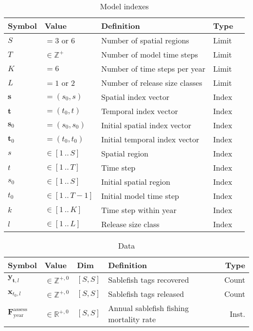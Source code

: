 \documentclass{article}
\begin{document}
\begin{table}[ht]
  \centering
  \caption{Model indexes}
  \renewcommand\arraystretch{1.2}
  \label{tab:model-indexes}
  \begin{tabular}{l l l l r}
    \toprule
    \textbf{Symbol} & \textbf{Value} & \textbf{Definition} & \textbf{Type} \\
    \toprule
    $S$ & $= 3$ or $6$ & Number of spatial regions & Limit \\
    $T$ & $\in \mathbb{Z}^{+}$ & Number of model time steps & Limit \\
    $K$ & $= 6$ & Number of time steps per year & Limit \\
    $L$ & $= 1$ or $2$ & Number of release size classes & Limit \\
    \midrule
    $\boldsymbol{s}$ & $= (s_0, s)$ & Spatial index vector & Index \\
    $\boldsymbol{t}$ & $= (t_0, t)$ & Temporal index vector & Index \\
    $\boldsymbol{s}_0$ & $= (s_0, s_0)$ & Initial spatial index vector & Index \\
    $\boldsymbol{t}_0$ & $= (t_0, t_0)$ & Initial temporal index vector & Index \\
    \midrule
    $s$ & $\in \left[1 \, .. \, S \right]$ & Spatial region & Index \\
    $t$ & $\in \left[1 \, .. \, T \right]$ & Time step & Index \\
    $s_0$ & $\in \left[1 \, .. \, S \right]$ & Initial spatial region & Index \\
    $t_0$ & $\in \left[1 \, .. \, T \! - \! 1 \right]$ & Initial model time step & Index \\
    $k$ & $\in \left[1 \, .. \, K \right]$ & Time step within year & Index \\
    $l$ & $\in \left[1 \, .. \, L \right]$ & Release size class & Index \\
    \bottomrule
  \end{tabular}
\end{table}

\begin{table}[ht]
  \centering
  \caption{Data}
  \renewcommand\arraystretch{1.2}
  \label{tab:data}
  \begin{tabular}{l l l l r}
    \toprule
    \textbf{Symbol} & \textbf{Value} & \textbf{Dim} & \textbf{Definition} & \textbf{Type} \\
    \toprule
    $\boldsymbol{y}_{\boldsymbol{t},l}$ & $\in \mathbb{Z}^{+,0}$ & $[S,S]$ & Sablefish tags recovered & Count \\
    $\boldsymbol{x}_{t_0,l}$ & $\in \mathbb{Z}^{+,0}$ & $[S,S]$ & Sablefish tags released & Count \\
    $\boldsymbol{F}^{\mathrm{assess}}_{\mathrm{year}}$ & $\in \mathbb{R}^{+,0}$ & $[S,S]$ & Annual sablefish fishing mortality rate & Inst. \\    
    \bottomrule
  \end{tabular}
\end{table}
\end{document}

